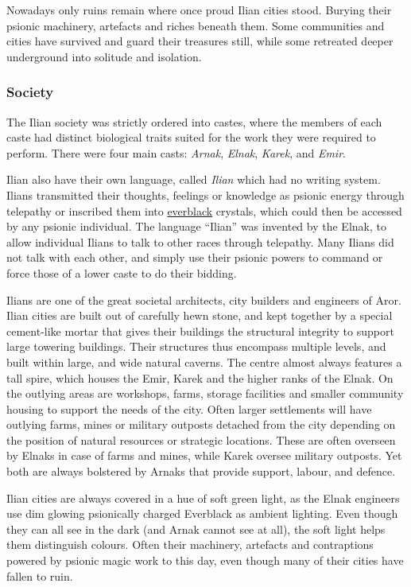 Nowadays only ruins remain where once proud Ilian cities stood. Burying their
psionic machinery, artefacts and riches beneath them. Some communities and
cities have survived and guard their treasures still, while some retreated
deeper underground into solitude and isolation.

\subsubsection{Society}

The Ilian society was strictly ordered into castes, where the members of each
caste had distinct biological traits suited for the work they were required to
perform. There were four main casts: \emph{Arnak}, \emph{Elnak}, \emph{Karek},
and \emph{Emir}.

Ilian also have their own language, called \emph{Ilian} which had no writing
system. Ilians transmitted their thoughts, feelings or knowledge as psionic
energy through telepathy or inscribed them into
\hyperref[sec:Everblack]{everblack} crystals, which could then be accessed by
any psionic individual. The language ``Ilian'' was invented by the Elnak, to
allow individual Ilians to talk to other races through telepathy. Many Ilians
did not talk with each other, and simply use their psionic powers to command
or force those of a lower caste to do their bidding.

Ilians are one of the great societal architects, city builders and engineers
of Aror. Ilian cities are built out of carefully hewn stone, and kept together
by a special cement-like mortar that gives their buildings the structural
integrity to support large towering buildings. Their structures thus encompass
multiple levels, and built within large, and wide natural caverns. The centre
almost always features a tall spire, which houses the Emir, Karek and the
higher ranks of the Elnak. On the outlying areas are workshops, farms, storage
facilities and smaller community housing to support the needs of the
city. Often larger settlements will have outlying farms, mines or military
outposts detached from the city depending on the position of natural resources
or strategic locations. These are often overseen by Elnaks in case of farms
and mines, while Karek oversee military outposts. Yet both are always
bolstered by Arnaks that provide support, labour, and defence.

Ilian cities are always covered in a hue of soft green light, as the Elnak
engineers use dim glowing psionically charged Everblack as ambient
lighting. Even though they can all see in the dark (and Arnak cannot see at
all), the soft light helps them distinguish colours. Often their machinery,
artefacts and contraptions powered by psionic magic work to this day, even
though many of their cities have fallen to ruin.

